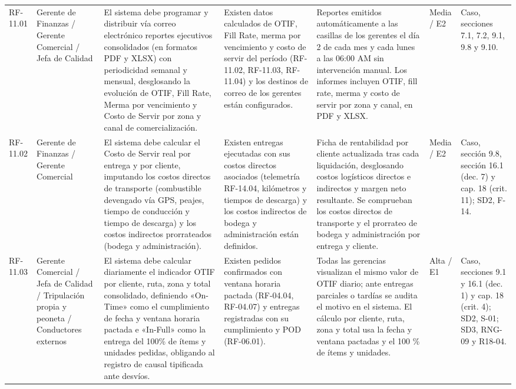 {\begin{longtable}{@{}F{0.062} F{0.080} F{0.195} F{0.160} F{0.240} F{0.093} F{0.170}@{}}
  RF-11.01 & Gerente de Finanzas / Gerente Comercial / Jefa de Calidad & El sistema debe programar y distribuir vía correo electrónico reportes ejecutivos consolidados (en formatos PDF y XLSX) con periodicidad semanal y mensual, desglosando la evolución de OTIF, Fill Rate, Merma por vencimiento y Costo de Servir por zona y canal de comercialización. & Existen datos calculados de OTIF, Fill Rate, merma por vencimiento y costo de servir del período (RF-11.02, RF-11.03, RF-11.04) y los destinos de correo de los gerentes están configurados. & Reportes emitidos automáticamente a las casillas de los gerentes el día 2 de cada mes y cada lunes a las 06:00 AM sin intervención manual. Los informes incluyen OTIF, fill rate, merma y costo de servir por zona y canal, en PDF y XLSX. & Media / E2 & Caso, secciones 7.1, 7.2, 9.1, 9.8 y 9.10. \\
  RF-11.02 & Gerente de Finanzas / Gerente Comercial & El sistema debe calcular el Costo de Servir real por entrega y por cliente, imputando los costos directos de transporte (combustible devengado vía GPS, peajes, tiempo de conducción y tiempo de descarga) y los costos indirectos prorrateados (bodega y administración). & Existen entregas ejecutadas con sus costos directos asociados (telemetría RF-14.04, kilómetros y tiempos de descarga) y los costos indirectos de bodega y administración están definidos. & Ficha de rentabilidad por cliente actualizada tras cada liquidación, desglosando costos logísticos directos e indirectos y margen neto resultante. Se comprueban los costos directos de transporte y el prorrateo de bodega y administración por entrega y cliente. & Media / E2 & Caso, sección 9.8, sección 16.1 (dec. 7) y cap. 18 (crit. 11); SD2, F-14. \\
  RF-11.03 & Gerente Comercial / Jefa de Calidad / Tripulación propia y peoneta / Conductores externos & El sistema debe calcular diariamente el indicador OTIF por cliente, ruta, zona y total consolidado, definiendo «On-Time» como el cumplimiento de fecha y ventana horaria pactada e «In-Full» como la entrega del 100\% de ítems y unidades pedidas, obligando al registro de causal tipificada ante desvíos. & Existen pedidos confirmados con ventana horaria pactada (RF-04.04, RF-04.07) y entregas registradas con su cumplimiento y POD (RF-06.01). & Todas las gerencias visualizan el mismo valor de OTIF diario; ante entregas parciales o tardías se audita el motivo en el sistema. El cálculo por cliente, ruta, zona y total usa la fecha y ventana pactadas y el 100 \% de ítems y unidades. & Alta / E1 & Caso, secciones 9.1 y 16.1 (dec. 1) y cap. 18 (crit. 4); SD2, S-01; SD3, RNG-09 y R18-04. \\

\end{longtable}}
